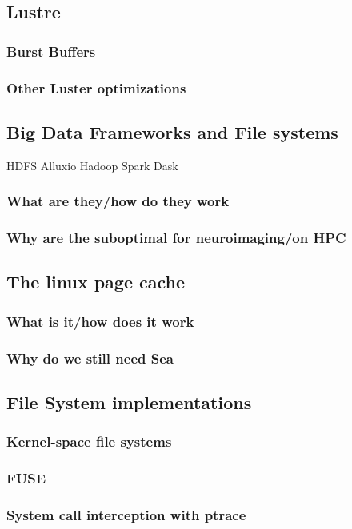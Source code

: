\documentclass[10pt,journal,compsoc]{IEEEtran}
\begin{document}
\subsection{Lustre}
\subsubsection{Burst Buffers}
\subsubsection{Other Luster optimizations}
\subsection{Big Data Frameworks and File systems}
HDFS Alluxio Hadoop Spark Dask
\subsubsection{What are they/how do they work}
\subsubsection{Why are the suboptimal for neuroimaging/on HPC}
\subsection{The linux page cache}
\subsubsection{What is it/how does it work}
\subsubsection{Why do we still need Sea}
\subsection{File System implementations}
\subsubsection{Kernel-space file systems}
\subsubsection{FUSE}
\subsubsection{System call interception with ptrace}
\end{document}
